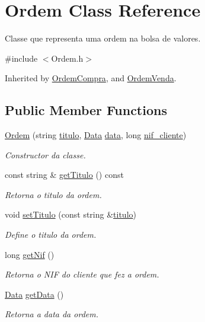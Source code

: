 \hypertarget{class_ordem}{}\section{Ordem Class Reference}
\label{class_ordem}


Classe que representa uma ordem na bolsa de valores.  




{\ttfamily \#include $<$Ordem.\+h$>$}



Inherited by \hyperlink{class_ordem_compra}{Ordem\+Compra}, and \hyperlink{class_ordem_venda}{Ordem\+Venda}.

\subsection*{Public Member Functions}
\begin{DoxyCompactItemize}
\item 
\hyperlink{class_ordem_af1b393aaaec4108c394ee099b8230a10}{Ordem} (string \hyperlink{class_ordem_a0773861bd9fb956d5ec62f2ef1de658b}{titulo}, \hyperlink{class_data}{Data} \hyperlink{class_ordem_a9f4dbc2966e98dcbd7e300ae346d8535}{data}, long \hyperlink{class_ordem_af6d06b4250735ae531bdcef5fa332f02}{nif\+\_\+cliente})
\begin{DoxyCompactList}\small\item\em Constructor da classe. \end{DoxyCompactList}\item 
const string \& \hyperlink{class_ordem_a1382c1e817af7abe07b66be2f3cf4e8d}{get\+Titulo} () const
\begin{DoxyCompactList}\small\item\em Retorna o titulo da ordem. \end{DoxyCompactList}\item 
void \hyperlink{class_ordem_aa8e4bc7713526fe31d8129465e7ff72a}{set\+Titulo} (const string \&\hyperlink{class_ordem_a0773861bd9fb956d5ec62f2ef1de658b}{titulo})
\begin{DoxyCompactList}\small\item\em Define o titulo da ordem. \end{DoxyCompactList}\item 
long \hyperlink{class_ordem_a637e9cd84bc0702bdb3d91e229076f43}{get\+Nif} ()
\begin{DoxyCompactList}\small\item\em Retorna o N\+IF do cliente que fez a ordem. \end{DoxyCompactList}\item 
\hyperlink{class_data}{Data} \hyperlink{class_ordem_ac20855509d9f35a85b1a89f30e2a4cfc}{get\+Data} ()
\begin{DoxyCompactList}\small\item\em Retorna a data da ordem. \end{DoxyCompactList}\end{DoxyCompactItemize}
